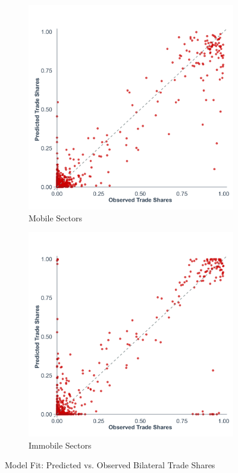 \begin{figure}[H]
    \centering
    \begin{subfigure}{0.48\textwidth}
        \centering
        \includegraphics[width=\textwidth]{code/figures/trade_flows_fit_mobile.png}
        \caption{Mobile Sectors}
        \label{fig:trade_flows_fit_mobile}
    \end{subfigure}
    \hfill
    \begin{subfigure}{0.48\textwidth}
        \centering
        \includegraphics[width=\textwidth]{code/figures/trade_flows_fit_immobile.png}
        \caption{Immobile Sectors}
        \label{fig:trade_flows_fit_immobile}
    \end{subfigure}
    \caption{Model Fit: Predicted vs. Observed Bilateral Trade Shares}
    \label{fig:trade_flows_fit}
\end{figure}

